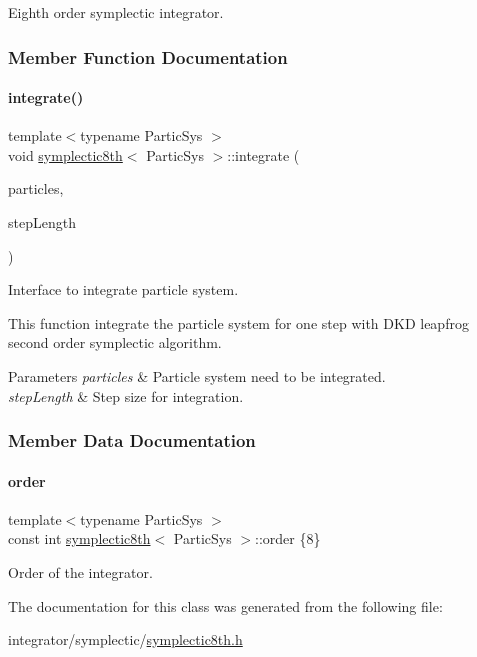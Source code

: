 Eighth order symplectic integrator. 

\subsubsection{Member Function Documentation}
\mbox{\label{classsymplectic8th_ab00fe2604c1471a27c2e6301c3820343}} 
\paragraph{\texorpdfstring{integrate()}{integrate()}}
{\footnotesize\ttfamily template$<$typename Partic\+Sys $>$ \\
void \mbox{\hyperlink{classsymplectic8th}{symplectic8th}}$<$ Partic\+Sys $>$\+::integrate (\begin{DoxyParamCaption}\item[{Partic\+Sys \&}]{particles,  }\item[{double}]{step\+Length }\end{DoxyParamCaption})}



Interface to integrate particle system. 

This function integrate the particle system for one step with D\+KD leapfrog second order symplectic algorithm. 
\begin{DoxyParams}{Parameters}
{\em particles} & Particle system need to be integrated. \\
\hline
{\em step\+Length} & Step size for integration. \\
\hline
\end{DoxyParams}


\subsubsection{Member Data Documentation}
\mbox{\label{classsymplectic8th_a5f80ae81362e3542cb9ed7653f1b20d6}} 
\paragraph{\texorpdfstring{order}{order}}
{\footnotesize\ttfamily template$<$typename Partic\+Sys $>$ \\
const int \mbox{\hyperlink{classsymplectic8th}{symplectic8th}}$<$ Partic\+Sys $>$\+::order \{8\}\hspace{0.3cm}{\ttfamily [static]}}



Order of the integrator. 



The documentation for this class was generated from the following file\+:\begin{DoxyCompactItemize}
\item 
integrator/symplectic/\mbox{\hyperlink{symplectic8th_8h}{symplectic8th.\+h}}\end{DoxyCompactItemize}
